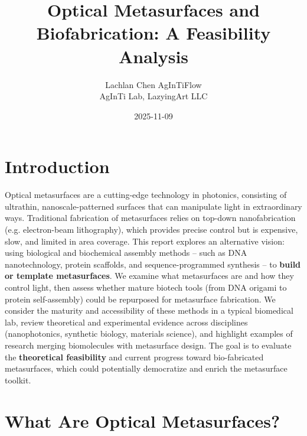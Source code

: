 \documentclass[11pt,a4paper]{article}
\title{Optical Metasurfaces and Biofabrication: A Feasibility Analysis}
\author{\begin{tabular}{c}Lachlan Chen \quad AgInTiFlow\\AgInTi Lab, LazyingArt LLC\end{tabular}}
\date{2025-11-09}
\begin{document}
\maketitle

\section{Introduction}

Optical metasurfaces are a cutting-edge technology in photonics, consisting of ultrathin, nanoscale-patterned surfaces that can manipulate light in extraordinary ways. Traditional fabrication of metasurfaces relies on top-down nanofabrication (e.g. electron-beam lithography), which provides precise control but is expensive, slow, and limited in area coverage. This report explores an alternative vision: using biological and biochemical assembly methods -- such as DNA nanotechnology, protein scaffolds, and sequence-programmed synthesis -- to \textbf{build or template metasurfaces}. We examine what metasurfaces are and how they control light, then assess whether mature biotech tools (from DNA origami to protein self-assembly) could be repurposed for metasurface fabrication. We consider the maturity and accessibility of these methods in a typical biomedical lab, review theoretical and experimental evidence across disciplines (nanophotonics, synthetic biology, materials science), and highlight examples of research merging biomolecules with metasurface design. The goal is to evaluate the \textbf{theoretical feasibility} and current progress toward bio-fabricated metasurfaces, which could potentially democratize and enrich the metasurface toolkit.

\section{What Are Optical Metasurfaces?}
\end{document}
